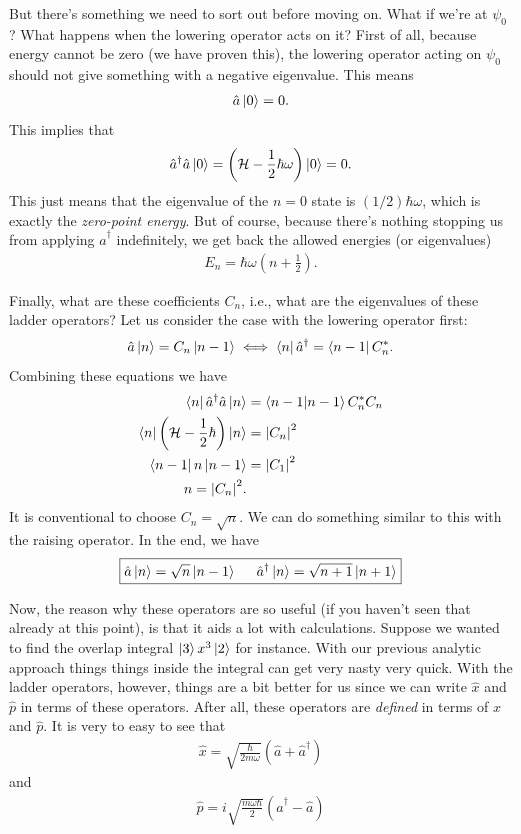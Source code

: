 \documentclass{book}
\theoremstyle{definition}
\newcommand{\ham}{\mathcal{H}}
\newcommand{\f}[2]{\frac{#1}{#2}}
\newcommand{\lp}{\left(}
\newcommand{\rp}{\right)}
\begin{document}
But there's something we need to sort out before moving on. What if we're at $\psi_0$? What happens when the lowering operator acts on it? First of all, because energy cannot be zero (we have proven this), the lowering operator acting on $\psi_0$ should not give something with a negative eigenvalue. This means 
\begin{align}
\hat{a}\ket{0} = 0.
\end{align}
This implies that 
\begin{align}
\hat{a}^\dagger\hat{a} \ket{0} = \lp \ham - \f{1}{2}\hbar\omega \rp\ket{0} = 0.
\end{align} 
This just means that the eigenvalue of the $n=0$ state is $(1/2)\hbar\omega$, which is exactly the \textit{zero-point energy}. But of course, because there's nothing stopping us from applying $\hat{a}^\dagger$ indefinitely, we get back the allowed energies (or eigenvalues)
\begin{align}
E_n = \hbar\omega\lp n + \f{1}{2} \rp.
\end{align} 


Finally, what are these coefficients $C_n$, i.e., what are the eigenvalues of these ladder operators? Let us consider the case with the lowering operator first:
\begin{align}
\hat{a}\ket{n} = C_n \ket{n-1} \iff \bra{n}\hat{a}^\dagger = \bra{n-1}C_n^*.
\end{align} 
Combining these equations we have
\begin{align}
\bra{n}\hat{a}^\dagger\hat{a}\ket{n} &= \braket{n-1}C^*_nC_n \\ 
\bra{n} \lp \ham - \f{1}{2}\hbar \rp\ket{n} &= \abs{C_n}^2\\
\bra{n-1} n \ket{n-1} &= \abs{C_1}^2\\
n = \abs{C_n}^2.
\end{align}
It is conventional to choose $C_n = \sqrt{n}$. We can do something similar to this with the raising operator. In the end, we have
\begin{align}
\boxed{\hat{a}\ket{n} = \sqrt{n}\ket{n-1} \hspace{0.5cm} \hat{a}^\dagger \ket{n} = \sqrt{n+1}\ket{n+1}}
\end{align}



Now, the reason why these operators are so useful (if you haven't seen that already at this point), is that it aids a lot with calculations. Suppose we wanted to find the overlap integral $\ket{3}x^3\ket{2}$ for instance. With our previous analytic approach things things inside the integral can get very nasty very quick. With the ladder operators, however, things are a bit better for us since we can write $\hat{x}$ and $\hat{p}$ in terms of these operators. After all, these operators are \textit{defined} in terms of $\hat{x}$ and $\hat{p}$. It is very to easy to see that
\begin{align}
\boxed{\hat{x} = \sqrt{\f{\hbar}{2m\omega}} (\hat{a} + \hat{a}^\dagger)}
\end{align}
and
\begin{align}
\boxed{\hat{p} = i\sqrt{\f{m\omega\hbar}{2}}(\hat{a}^\dagger - \hat{a})}
\end{align}
\end{document}
